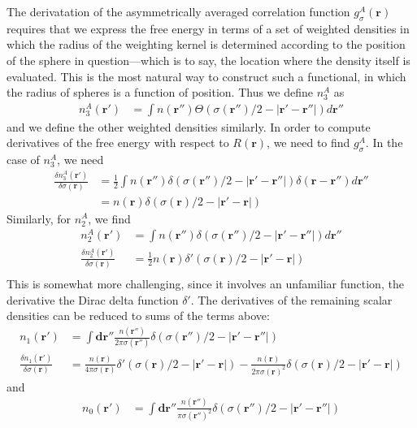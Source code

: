 \documentclass[letterpaper,twocolumn,amsmath,amssymb,jcp,10pt,aip]{revtex4-1}
\newcommand{\rr}{\textbf{r}}
\begin{document}
\begin{widetext}
The derivatation of the asymmetrically averaged correlation function
$g_\sigma^A(\rr)$ requires that we express the free energy in terms of
a set of weighted densities in which the radius of the weighting
kernel is determined according to the position of the sphere in
question---which is to say, the location where the density itself is
evaluated.  This is the most natural way to construct such a
functional, in which the radius of spheres is a function of position.
Thus we define $n_3^A$ as
\begin{align}
  n_3^{A}(\rr') &= \int n(\rr'') \Theta(\sigma(\rr'')/2 -\left|\rr' - \rr''\right|) d\rr''
\end{align}
and we define the other weighted densities similarly.  In order to
compute derivatives of the free energy with respect to $R(\rr)$, we
need to find $g_\sigma^A$.  In the case of $n_3^A$, we need
\begin{align}
  \frac{\delta n_3^{A} (\rr')}{\delta \sigma(\rr)} &=
  \frac 12 \int n (\rr'') \delta(\sigma(\rr'')/2 -\left|\rr' - \rr''\right|) \delta(\rr-\rr'') d\rr'' \\
   &= n (\rr) \delta(\sigma(\rr)/2 -\left|\rr' - \rr\right|)
\end{align}
Similarly, for $n_2^A$, we find
\begin{align}
  n_2^{A}(\rr') &= \int n(\rr'') \delta(\sigma(\rr'')/2 -\left|\rr' - \rr''\right|) d \rr''\\
  \frac{\delta n_2^{A}(\rr')}{\delta \sigma(\rr)} &= \frac 12 n(\rr) \delta'(\sigma(\rr)/2 -\left|\rr' - \rr\right|)\\
\end{align}
This is somewhat more challenging, since it involves an unfamiliar
function, the derivative the Dirac delta function $\delta'$.
%
The derivatives of the remaining scalar densities can be reduced to
sums of the terms above:
\begin{align}
  n_1(\rr') &= \int \mathbf{dr''} \frac{n(\rr'')}{2\pi \sigma(\rr'')}
  \delta(\sigma(\rr'')/2 -\left|\rr' - \rr''\right|) \\
  \frac{\delta n_1(\rr')}{\delta \sigma(\rr)}
  &= \frac{n(\rr)}{4\pi
    \sigma(\rr)}\delta'(\sigma(\rr)/2 -\left|\rr' - \rr\right|)
  -
  \frac{n(\rr)}{2\pi
    \sigma(\rr)^2}\delta(\sigma(\rr)/2 -\left|\rr' - \rr\right|)
\end{align}
and
\begin{align}
  n_0(\rr') &= \int \mathbf{dr''} \frac{n(\rr'')}{\pi \sigma(\rr'')^2}
  \delta(\sigma(\rr'')/2 -\left|\rr' - \rr''\right|) \\

\end{align}
\end{widetext}
\end{document}
